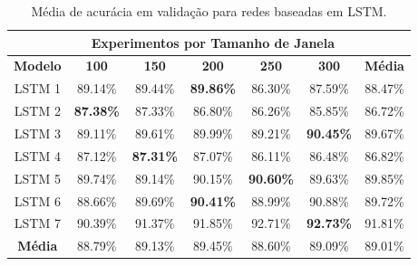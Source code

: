 \begin{table}[H]
\scriptsize
\centering
\caption{Média de acurácia em validação para redes baseadas em LSTM.} 
\label{table:lstm_results_tipo_superficie_1}
\begin{tabular}{ccccccc}
\cmidrule(lr){2-6}
& \multicolumn{5}{c}{\textbf{Experimentos por Tamanho de Janela}} & \multicolumn{1}{c}{} \\ \midrule
\textbf{Modelo} & \multicolumn{1}{c}{\textbf{100}} & \multicolumn{1}{c}{\textbf{150}} & \multicolumn{1}{c}{\textbf{200}} & \multicolumn{1}{c}{\textbf{250}} & \multicolumn{1}{c}{\textbf{300}} & \multicolumn{1}{c}{\textbf{Média}} \\ \midrule
LSTM 1 & 89.14\% & 89.44\% & \textbf{89.86\%} & 86.30\% & 87.59\% & 88.47\% \\ \midrule
LSTM 2 & \textbf{87.38\%} & 87.33\% & 86.80\% & 86.26\% & 85.85\% & 86.72\% \\ \midrule
LSTM 3 & 89.11\% & 89.61\% & 89.99\% & 89.21\% & \textbf{90.45\%} & 89.67\% \\ \midrule
LSTM 4 & 87.12\% & \textbf{87.31\%} & 87.07\% & 86.11\% & 86.48\% & 86.82\% \\ \midrule
LSTM 5 & 89.74\% & 89.14\% & 90.15\% & \textbf{90.60\%} & 89.63\% & 89.85\% \\ \midrule
LSTM 6 & 88.66\% & 89.69\% & \textbf{90.41\%} & 88.99\% & 90.88\% & 89.72\% \\ \midrule
LSTM 7 & 90.39\% & 91.37\% & 91.85\% & 92.71\% & \cellcolor[HTML]{34FF34}\textbf{92.73\%} & 91.81\% \\ \midrule
\textbf{Média} & 88.79\% & 89.13\% & 89.45\% & 88.60\% & 89.09\% & 89.01\% \\ \bottomrule
\end{tabular}
\end{table}

